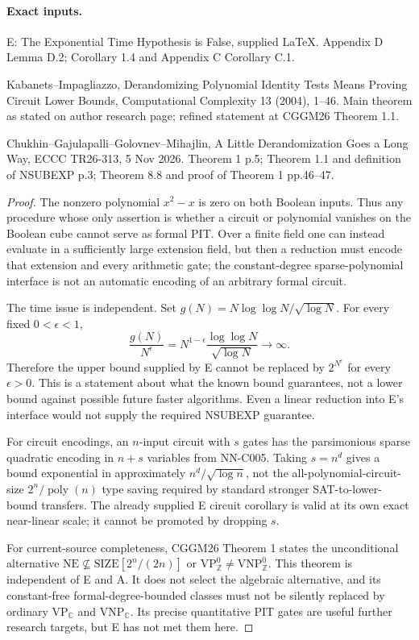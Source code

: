 \paragraph{Exact inputs.}
E: The Exponential Time Hypothesis is False, supplied LaTeX. Appendix D Lemma D.2; Corollary 1.4 and Appendix C Corollary C.1.

Kabanets--Impagliazzo, Derandomizing Polynomial Identity Tests Means Proving Circuit Lower Bounds, Computational Complexity 13 (2004), 1--46. Main theorem as stated on author research page; refined statement at CGGM26 Theorem 1.1.

Chukhin--Gajulapalli--Golovnev--Mihajlin, A Little Derandomization Goes a Long Way, ECCC TR26-313, 5 Nov 2026. Theorem 1 p.5; Theorem 1.1 and definition of NSUBEXP p.3; Theorem 8.8 and proof of Theorem 1 pp.46--47.

\begin{proof}
The nonzero polynomial $x^2-x$ is zero on both Boolean inputs. Thus any procedure whose only assertion is whether a circuit or polynomial vanishes on the Boolean cube cannot serve as formal PIT. Over a finite field one can instead evaluate in a sufficiently large extension field, but then a reduction must encode that extension and every arithmetic gate; the constant-degree sparse-polynomial interface is not an automatic encoding of an arbitrary formal circuit.

The time issue is independent. Set $g(N)=N\log\log N/\sqrt{\log N}$. For every fixed $0<\epsilon<1$,
\[
 \frac{g(N)}{N^\epsilon}
 =N^{1-\epsilon}\frac{\log\log N}{\sqrt{\log N}}\longrightarrow\infty.
\]
Therefore the upper bound supplied by E cannot be replaced by $2^{N^\epsilon}$ for every $\epsilon>0$. This is a statement about what the known bound guarantees, not a lower bound against possible future faster algorithms. Even a linear reduction into E's interface would not supply the required NSUBEXP guarantee.

For circuit encodings, an $n$-input circuit with $s$ gates has the parsimonious sparse quadratic encoding in $n+s$ variables from NN-C005. Taking $s=n^d$ gives a bound exponential in approximately $n^d/\sqrt{\log n}$, not the all-polynomial-circuit-size $2^n/\operatorname{poly}(n)$ type saving required by standard stronger SAT-to-lower-bound transfers. The already supplied E circuit corollary is valid at its own exact near-linear scale; it cannot be promoted by dropping $s$.

For current-source completeness, CGGM26 Theorem 1 states the unconditional alternative $\mathrm{NE}\not\subseteq\mathrm{SIZE}[2^n/(2n)]$ or $\mathrm{VP}_{\mathbb Z}^{0}\ne\mathrm{VNP}_{\mathbb Z}^{0}$. This theorem is independent of E and A. It does not select the algebraic alternative, and its constant-free formal-degree-bounded classes must not be silently replaced by ordinary $\mathrm{VP}_{\mathbb C}$ and $\mathrm{VNP}_{\mathbb C}$. Its precise quantitative PIT gates are useful further research targets, but E has not met them here.
\end{proof}
